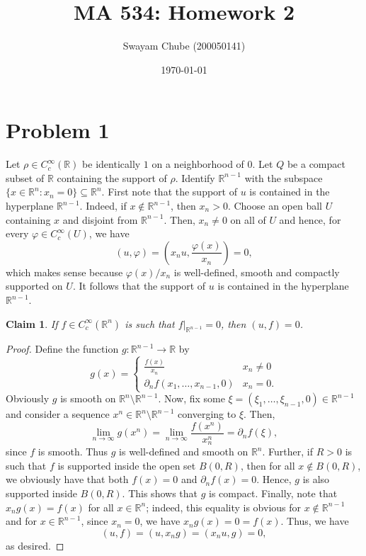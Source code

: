 \documentclass[10pt]{amsart}
\title{MA 534: Homework 2}
\author{Swayam Chube (200050141)}
\date{\today}
\theoremstyle{thmstyle}
\newtheorem*{claim}{Claim}
\theoremstyle{defstyle}
\newcommand{\R}{\mathbb{R}}
\begin{document}
\maketitle 

\section{Problem 1}

Let $\rho\in C_c^\infty(\R)$ be identically $1$ on a neighborhood of $0$. Let $Q$ be a compact subset of $\R$ containing the support of $\rho$. Identify $\R^{n - 1}$ with the subspace $\{x\in\R^n\colon x_n = 0\}\subseteq\R^n$. First note that the support of $u$ is contained in the hyperplane $\R^{n - 1}$. Indeed, if $x\notin\R^{n - 1}$, then $x_n > 0$. Choose an open ball $U$ containing $x$ and disjoint from $\R^{n - 1}$. Then, $x_n\ne 0$ on all of $U$ and hence, for every $\varphi\in C_c^\infty(U)$, we have 
\begin{equation*}
    (u, \varphi) = \left(x_n u, \frac{\varphi(x)}{x_n}\right) = 0,
\end{equation*}
which makes sense because $\varphi(x)/x_n$ is well-defined, smooth and compactly supported on $U$. It follows that the support of $u$ is contained in the hyperplane $\R^{n - 1}$.

\begin{claim}
    If $f\in C_c^\infty(\R^n)$ is such that $f|_{\R^{n - 1}} = 0$, then $(u, f) = 0$.
\end{claim}
\begin{proof}
    Define the function $g:\R^{n - 1}\to\R$ by 
    \begin{equation*}
        g(x) = 
        \begin{cases}
            \frac{f(x)}{x_n} & x_n\ne 0\\
            \partial_n f(x_1,\dots,x_{n - 1}, 0) & x_n = 0.
        \end{cases}
    \end{equation*}
    Obviously $g$ is smooth on $\R^n\setminus \R^{n - 1}$. Now, fix some $\xi = (\xi_1,\dots,\xi_{n - 1}, 0)\in\R^{n - 1}$ and consider a sequence $x^n\in\R^n\setminus\R^{n - 1}$ converging to $\xi$. Then, 
    \begin{equation*}
        \lim_{n\to\infty}g(x^n) = \lim_{n\to\infty} \frac{f(x^n)}{x^n_n} = \partial_n f(\xi),
    \end{equation*}
    since $f$ is smooth. Thus $g$ is well-defined and smooth on $\R^n$. Further, if $R > 0$ is such that $f$ is supported inside the open set $B(0, R)$, then for all $x\notin B(0, R)$, we obviously have that both $f(x) = 0$ and $\partial_n f(x) = 0$. Hence, $g$ is also supported inside $B(0, R)$. This shows that $g$ is compact. Finally, note that $x_ng(x) = f(x)$ for all $x\in\R^n$; indeed, this equality is obvious for $x\notin\R^{n - 1}$ and for $x\in\R^{n - 1}$, since $x_n = 0$, we have $x_ng(x) = 0 = f(x)$. Thus, we have 
    \begin{equation*}
        (u, f) = (u, x_ng) = (x_nu, g) = 0, 
    \end{equation*}
    as desired.
\end{proof}
\end{document}
